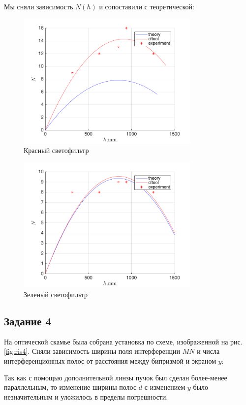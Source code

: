 Мы сняли зависимость $N(h)$ и сопоставили с теоретической:

\begin{figure}[H]
	\centering
	\includegraphics[width=0.8\textwidth]{data/N_r.png}
	\caption{Красный светофильтр}
	\label{fig:dd_g}
\end{figure}
\begin{figure}[H]
	\centering
	\includegraphics[width=0.8\textwidth]{data/N_g.png}
	\caption{Зеленый светофильтр}
	\label{fig:N_g}
\end{figure}

\subsection{Задание 4}
На оптической скамье была собрана установка по схеме, изображенной на рис. \ref{fig:ris4}. Сняли зависимость ширины поля интерференции $MN$ и числа интерференционных полос от расстояния между бипризмой	 и экраном $y$:



Так как с помощью дополнительной линзы пучок был сделан более-менее параллельным, то изменение ширины полос $d$ с изменением $y$ было незначительным и уложилось в пределы погрешности.

